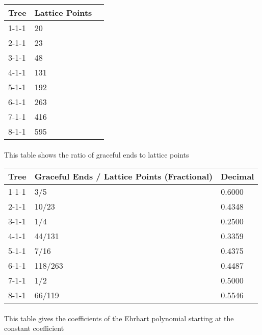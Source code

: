 \documentclass{article}
\begin{document}
\begin{center}
              \begin{tabular}{| l | l | l |}
              \hline
              Tree & Lattice Points \\ 
              \hline
1-1-1 & 20\\
\hline
2-1-1 & 23\\
\hline
3-1-1 & 48\\
\hline
4-1-1 & 131\\
\hline
5-1-1 & 192\\
\hline
6-1-1 & 263\\
\hline
7-1-1 & 416\\
\hline
8-1-1 & 595\\
\hline
\hline
              \end{tabular}
              \end{center}\paragraph{} This table shows the ratio of graceful ends to             lattice points
\begin{center}
              \begin{tabular}{| l | l | l |}
              \hline
              Tree & Graceful Ends / Lattice Points (Fractional) & Decimal\\ 
              \hline
1-1-1 & 3/5                 & 0.6000\\ 
\hline
2-1-1 & 10/23                 & 0.4348\\ 
\hline
3-1-1 & 1/4                 & 0.2500\\ 
\hline
4-1-1 & 44/131                 & 0.3359\\ 
\hline
5-1-1 & 7/16                 & 0.4375\\ 
\hline
6-1-1 & 118/263                 & 0.4487\\ 
\hline
7-1-1 & 1/2                 & 0.5000\\ 
\hline
8-1-1 & 66/119                 & 0.5546\\ 
\hline
\hline
              \end{tabular}
              \end{center}\paragraph{} This table gives the coefficients of the Ehrhart     polynomial starting at the constant coefficient
\end{document}
